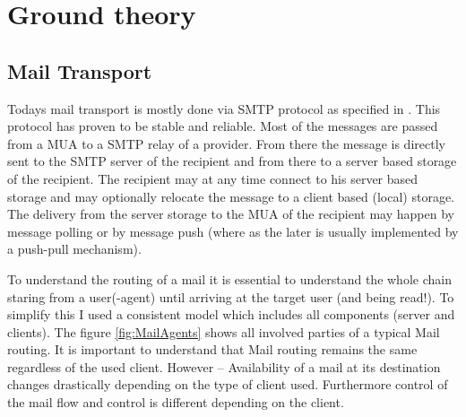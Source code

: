 \chapter{Ground theory}
\section{Mail Transport\label{sec:mailTransport}}
Todays mail transport is mostly done via SMTP protocol as specified in \cite{RFC5321}. This protocol has proven to be stable and reliable. Most of the messages are passed from a MUA to a SMTP relay of a provider. From there the message is directly sent to the SMTP server of the recipient and from there to a server based storage of the recipient. The recipient may at any time connect to his server based storage and may optionally relocate the message to a client based (local) storage. The delivery from the server storage to the MUA of the recipient may happen by message polling or by message push (where as the later is usually implemented by a push-pull mechanism).\par

To understand the routing of a mail it is essential to understand the whole chain staring from a user(-agent) until arriving at the target user (and being read!). To simplify this I used a consistent model which includes all components (server and clients). The figure \ref{fig:MailAgents} shows all involved parties of a typical Mail routing. It is important to understand that Mail routing remains the same regardless of the used client. However -- Availability of a mail at its destination changes drastically depending on the type of client used. Furthermore control of the mail flow and control is different depending on the client.\par

